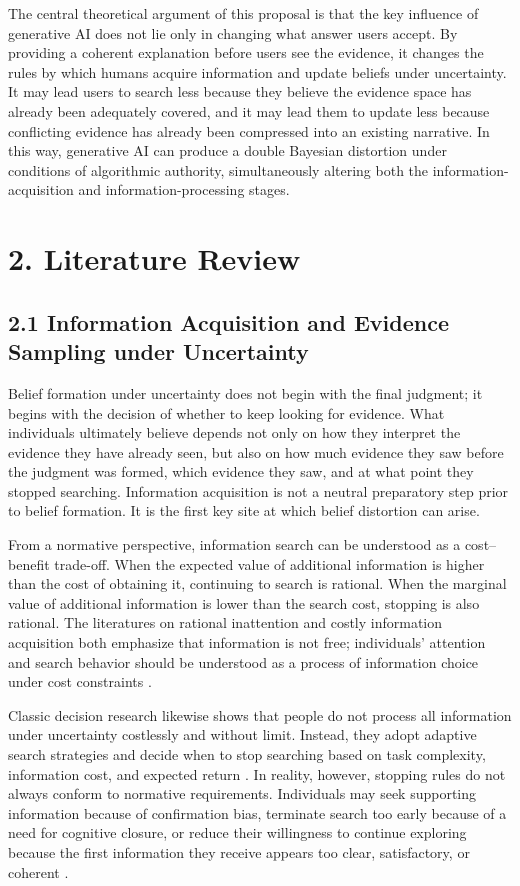 The central theoretical argument of this proposal is that the key influence of generative AI does not lie only in changing what answer users accept. By providing a coherent explanation before users see the evidence, it changes the rules by which humans acquire information and update beliefs under uncertainty. It may lead users to search less because they believe the evidence space has already been adequately covered, and it may lead them to update less because conflicting evidence has already been compressed into an existing narrative. In this way, generative AI can produce a double Bayesian distortion under conditions of algorithmic authority, simultaneously altering both the information-acquisition and information-processing stages.

\section*{2. Literature Review}

\subsection*{2.1 Information Acquisition and Evidence Sampling under Uncertainty}

Belief formation under uncertainty does not begin with the final judgment; it begins with the decision of whether to keep looking for evidence. What individuals ultimately believe depends not only on how they interpret the evidence they have already seen, but also on how much evidence they saw before the judgment was formed, which evidence they saw, and at what point they stopped searching. Information acquisition is not a neutral preparatory step prior to belief formation. It is the first key site at which belief distortion can arise.

From a normative perspective, information search can be understood as a cost--benefit trade-off. When the expected value of additional information is higher than the cost of obtaining it, continuing to search is rational. When the marginal value of additional information is lower than the search cost, stopping is also rational. The literatures on rational inattention and costly information acquisition both emphasize that information is not free; individuals' attention and search behavior should be understood as a process of information choice under cost constraints \citep{Sims2003,CaplinDean2015}.

Classic decision research likewise shows that people do not process all information under uncertainty costlessly and without limit. Instead, they adopt adaptive search strategies and decide when to stop searching based on task complexity, information cost, and expected return \citep{PayneBettmanJohnson1993}. In reality, however, stopping rules do not always conform to normative requirements. Individuals may seek supporting information because of confirmation bias, terminate search too early because of a need for cognitive closure, or reduce their willingness to continue exploring because the first information they receive appears too clear, satisfactory, or coherent \citep{Nickerson1998,LordRossLepper1979}.

